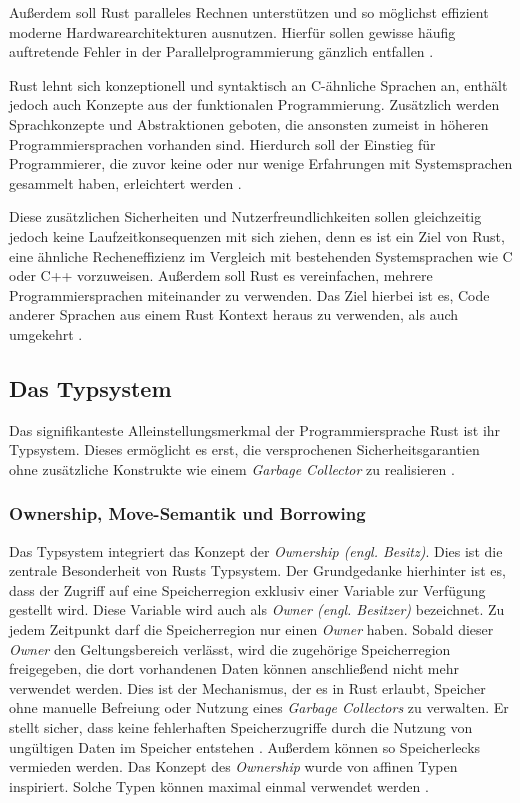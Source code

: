 Außerdem soll Rust paralleles Rechnen unterstützen und
so möglichst effizient moderne Hardwarearchitekturen ausnutzen.
Hierfür sollen gewisse häufig auftretende Fehler in der Parallelprogrammierung gänzlich entfallen
\cite{theRustLanguage}.

Rust lehnt sich konzeptionell und syntaktisch an C-ähnliche Sprachen an, enthält jedoch auch Konzepte aus der
funktionalen Programmierung. Zusätzlich werden Sprachkonzepte und Abstraktionen geboten, die
ansonsten zumeist in höheren Programmiersprachen vorhanden sind. Hierdurch soll der Einstieg für
Programmierer, die zuvor keine oder nur wenige Erfahrungen mit Systemsprachen gesammelt haben, erleichtert werden
\cite{engineeringServo}.

Diese zusätzlichen Sicherheiten und Nutzerfreundlichkeiten sollen gleichzeitig jedoch keine Laufzeitkonsequenzen mit 
sich ziehen, denn es ist ein Ziel von Rust, 
eine ähnliche Recheneffizienz im Vergleich mit bestehenden Systemsprachen wie C oder C++ vorzuweisen.
Außerdem soll Rust es vereinfachen, mehrere Programmiersprachen miteinander zu verwenden.
Das Ziel hierbei ist es, Code anderer Sprachen aus einem Rust Kontext heraus zu verwenden, als auch umgekehrt
\cite{rustBook}.


\subsection{Das Typsystem}\label{sec:rust_type_system}

Das signifikanteste Alleinstellungsmerkmal der Programmiersprache Rust ist ihr Typsystem. Dieses ermöglicht es
erst, die versprochenen Sicherheitsgarantien ohne zusätzliche Konstrukte wie einem \textit{Garbage Collector}
zu realisieren \cite{rustBook}.

\subsubsection{Ownership, Move-Semantik und Borrowing}

Das Typsystem integriert das Konzept der \textit{Ownership (engl. Besitz)}.
Dies ist die zentrale Besonderheit von Rusts Typsystem.
Der Grundgedanke hierhinter ist es, dass der Zugriff auf eine Speicherregion exklusiv einer Variable
zur Verfügung gestellt wird. Diese Variable wird auch als \textit{Owner (engl. Besitzer)} bezeichnet.
Zu jedem Zeitpunkt darf die Speicherregion nur einen \textit{Owner} haben.
Sobald dieser \textit{Owner} den Geltungsbereich verlässt, wird die zugehörige Speicherregion freigegeben,
die dort vorhandenen Daten können anschließend nicht mehr verwendet werden.
Dies ist der Mechanismus, der es in Rust erlaubt, Speicher ohne manuelle Befreiung oder Nutzung eines
\textit{Garbage Collectors} zu verwalten. Er stellt sicher, dass keine fehlerhaften Speicherzugriffe
durch die Nutzung von ungültigen Daten im Speicher entstehen \cite{rustBook}. Außerdem können so Speicherlecks
vermieden werden.
Das Konzept des \textit{Ownership} wurde von affinen Typen inspiriert.\cite{embeddedRustOS}
Solche Typen können maximal einmal verwendet werden \cite{affineTypes}.

